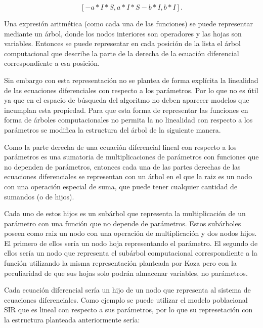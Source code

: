 $$[-a*I*S, a*I*S - b*I, b*I].$$

Una expresión aritmética (como cada una de las funciones) se puede representar mediante un árbol, donde los nodos interiores son operadores y las hojas son variables. Entonces se puede representar en cada posición de la lista el árbol computacional que describe la parte de la derecha de la ecuación diferencial correspondiente a esa posición.

Sin embargo con esta representación no se plantea de forma explícita la linealidad de las ecuaciones diferenciales con respecto a los parámetros. Por lo que no es útil ya que en el espacio de búsqueda del algoritmo no deben aparecer modelos que incumplan esta propiedad. Para que esta forma de representar las funciones en forma de árboles computacionales no permita la no linealidad con respecto a los parámetros se modifica la estructura del árbol de la siguiente manera.

Como la parte derecha de una ecuación diferencial lineal con respecto a los parámetros es una sumatoria de multiplicaciones de parámetros con funciones que no dependen de parámetros, entonces cada una de las partes derechas de las ecuaciones diferenciales se representan con un árbol en el que la raiz es un nodo con una operación especial de suma, que puede tener cualquier cantidad de sumandos (o de hijos).

Cada uno de estos hijos es un subárbol que representa la multiplicación de un parámetro con una función que no depende de parámetros. Estos subárboles poseen como raiz un nodo con una operación de multiplicación y dos nodos hijos. El primero de ellos sería un nodo hoja representando el parámetro. El segundo de ellos sería un nodo que representa el subárbol computacional correspondiente a la función utilizando la misma representación planteada por Koza pero con la peculiaridad de que sus hojas solo podrán almacenar variables, no parámetros.

Cada ecuación diferencial sería un hijo de un nodo que representa al sistema de ecuaciones diferenciales. Como ejemplo se puede utilizar el modelo poblacional SIR que es lineal con respecto a sus parámetros, por lo que su represetación con la estructura planteada anteriormente sería:

